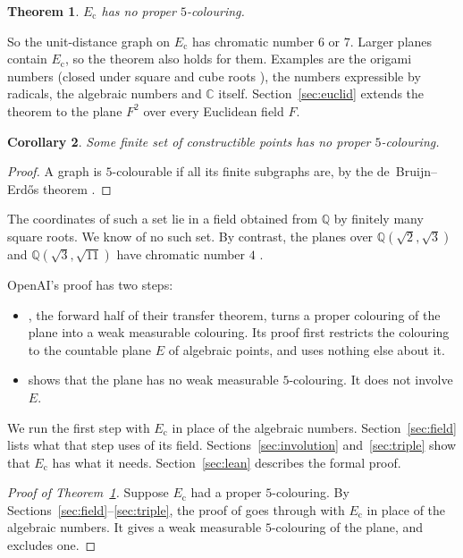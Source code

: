 \documentclass[11pt,a4paper]{amsart}
\newtheorem{theorem}{Theorem}
\newtheorem{corollary}[theorem]{Corollary}
\theoremstyle{remark}
\newcommand{\C}{\mathbb{C}}
\newcommand{\Q}{\mathbb{Q}}
\newcommand{\Ec}{E_{\mathrm{c}}}
\begin{document}
\begin{theorem}\label{thm:main}
$\Ec$ has no proper $5$-colouring.
\end{theorem}

So the unit-distance graph on $\Ec$ has chromatic number $6$ or $7$. Larger planes contain $\Ec$, so the theorem
also holds for them. Examples are the origami numbers (closed under square and cube roots \cite{Alperin}), the
numbers expressible by radicals, the algebraic numbers and $\C$ itself. Section~\ref{sec:euclid} extends the theorem to the plane $F^2$
over every Euclidean field $F$.

\begin{corollary}\label{cor:finite}
Some finite set of constructible points has no proper $5$-colouring.
\end{corollary}

\begin{proof}
A graph is $5$-colourable if all its finite subgraphs are, by the de~Bruijn--Erd\H{o}s theorem
\cite{deBruijnErdos}.
\end{proof}

The coordinates of such a set lie in a field obtained from $\Q$ by finitely many square roots. We know of no such
set. By contrast, the planes over $\Q(\sqrt2,\sqrt3)$ and $\Q(\sqrt3,\sqrt{11})$ have chromatic number $4$
\cite{P4C,Fischer}.

OpenAI's proof has two steps:
\begin{itemize}
\item \cite[Prop.~4.2]{OpenAI}, the forward half of their transfer theorem, turns a proper colouring of the plane into
a weak measurable colouring. Its proof first restricts the colouring to the countable plane $E$ of algebraic
points, and uses nothing else about it.
\item \cite[Thm.~1.4]{OpenAI} shows that the plane has no weak measurable $5$-colouring. It does not involve $E$.
\end{itemize}
We run the first step with $\Ec$ in place of the algebraic numbers. Section~\ref{sec:field} lists what that step uses
of its field. Sections~\ref{sec:involution} and~\ref{sec:triple} show that $\Ec$ has what it needs. Section~\ref{sec:lean}
describes the formal proof.

\begin{proof}[Proof of Theorem~\ref{thm:main}]
Suppose $\Ec$ had a proper $5$-colouring. By Sections~\ref{sec:field}--\ref{sec:triple}, the proof of
\cite[Prop.~4.2]{OpenAI} goes through with $\Ec$ in place of the algebraic numbers. It gives a weak measurable
$5$-colouring of the plane, and \cite[Thm.~1.4]{OpenAI} excludes one.
\end{proof}
\end{document}

